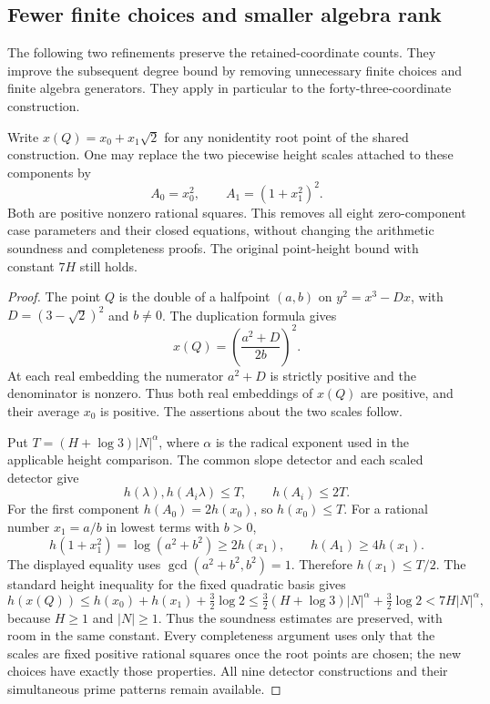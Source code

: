 \subsection{Fewer finite choices and smaller algebra rank}
\label{subsec:shared-degree-refinements}

The following two refinements preserve the retained-coordinate counts.
They improve the subsequent degree bound by removing unnecessary
finite choices and finite algebra generators.  They apply in
particular to the forty-three-coordinate construction.

\begin{lemma}
\label{lem:fixed-height-scales}
Write $x(Q)=x_0+x_1\sqrt2$ for any nonidentity root point of the
shared construction.  One may replace the two piecewise height
scales attached to these components by
\[
                         A_0=x_0^2,
              \qquad A_1=(1+x_1^2)^2.
\]
Both are positive nonzero rational squares.  This removes all
eight zero-component case parameters and their closed equations,
without changing the arithmetic soundness and completeness proofs.
The original point-height bound with constant $7H$ still holds.
\end{lemma}
\begin{proof}
The point $Q$ is the double of a halfpoint $(a,b)$ on
$y^2=x^3-Dx$, with $D=(3-\sqrt2)^2$ and $b\ne0$.
The duplication formula gives
\[
                   x(Q)=\left(\frac{a^2+D}{2b}\right)^2.
\]
At each real embedding the numerator $a^2+D$ is strictly positive
and the denominator is nonzero.  Thus both real embeddings of
$x(Q)$ are positive, and their average $x_0$ is positive.
The assertions about the two scales follow.

Put $T=(H+\log3)|N|^\alpha$, where $\alpha$ is the radical
exponent used in the applicable height comparison.  The common
slope detector and each scaled detector give
\[
               h(\lambda),h(A_i\lambda)\le T,
               \qquad h(A_i)\le2T.
\]
For the first component $h(A_0)=2h(x_0)$, so $h(x_0)\le T$.
For a rational number $x_1=a/b$ in lowest terms with $b>0$,
\[
 h(1+x_1^2)=\log(a^2+b^2)\ge2h(x_1),
 \qquad h(A_1)\ge4h(x_1).
\]
The displayed equality uses
$\gcd(a^2+b^2,b^2)=1$.  Therefore $h(x_1)\le T/2$.  The
standard height inequality for the fixed quadratic basis gives
\[
 h(x(Q))\le h(x_0)+h(x_1)+\tfrac32\log2
 \le\tfrac32(H+\log3)|N|^\alpha+\tfrac32\log2
 <7H|N|^\alpha,
\]
because $H\ge1$ and $|N|\ge1$.  Thus the soundness estimates are
preserved, with room in the same constant.  Every completeness
argument uses only that the scales are fixed positive rational
squares once the root points are chosen; the new choices have
exactly those properties.  All nine detector constructions and
their simultaneous prime patterns remain available.
\end{proof}

